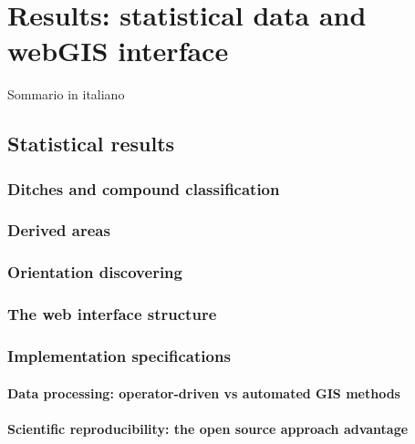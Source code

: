 \chapter{Results: statistical data and webGIS interface}

    \vspace{0.06\textheight}
    \begin{chaptersum}
        Sommario in italiano
    \end{chaptersum}

    \section{Statistical results}
        \subsection{Ditches and compound classification}
        \subsection{Derived areas}
        \subsection{Orientation discovering}
        \subsection{The web interface structure}
        \subsection{Implementation specifications}
            \subsubsection{Data processing: operator-driven vs automated GIS methods}
            \subsubsection{Scientific reproducibility: the open source approach advantage}
